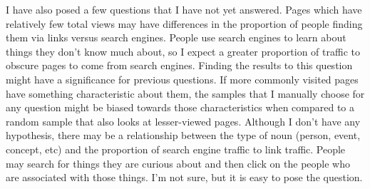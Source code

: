 \documentclass{article}
\begin{document}
I have also posed a few questions that I have not yet answered. Pages which have relatively few total views may have differences in the proportion of people finding them via links versus search engines. People use search engines to learn about things they don’t know much about, so I expect a greater proportion of traffic to obscure pages to come from search engines. Finding the results to this question might have a significance for previous questions. If more commonly visited pages have something characteristic about them, the samples that I manually choose for any question might be biased towards those characteristics when compared to a random sample that also looks at lesser-viewed pages. Although I don’t have any hypothesis, there may be a relationship between the type of noun (person, event, concept, etc) and the proportion of search engine traffic to link traffic. People may search for things they are curious about and then click on the people who are associated with those things. I’m not sure, but it is easy to pose the question.
\end{document}
